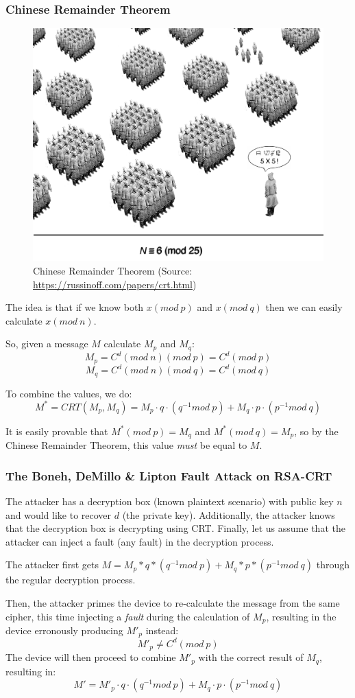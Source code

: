 \subsubsection{Chinese Remainder Theorem}
\begin{figure}[h!]
    \centering
    \includegraphics[width=0.5\linewidth]{images/ch9/soldiers.jpeg}
    \caption{Chinese Remainder Theorem (Source: \url{https://russinoff.com/papers/crt.html})}
    \label{fig:chinese_remainder}
\end{figure}
The idea is that if we know both $x (mod\ p)$ and $x (mod\ q)$ then we can easily calculate $x (mod\ n)$.

So, given a message $M$ calculate $M_p$ and $M_q$:
\[M_p = C^d (mod\ n)(mod\ p) = C^d (mod\ p)\]
\[M_q = C^d (mod\ n)(mod\ q) = C^d (mod\ q)\]

To combine the values, we do:
\[
    M^* = CRT(M_p, M_q) = M_p \cdot q \cdot (q^{-1} mod\ p) + M_q \cdot p \cdot (p^{-1} mod\ q)
\]

It is easily provable that \(M^*(mod\ p)=M_q\) and \(M^*(mod\ q)=M_p\), so by the Chinese Remainder Theorem, this value \emph{must} be equal to $M$.

\subsubsection{The Boneh, DeMillo \& Lipton Fault Attack on RSA-CRT \cite{bib:boneh}}

The attacker has a decryption box (known plaintext scenario) with public key $n$ and would like to recover $d$ (the private key). Additionally, the attacker knows that the decryption box is decrypting using CRT. Finally, let us assume that the attacker can inject a fault (any fault) in the decryption process.

The attacker first gets \(M = M_p*q*(q^{-1} mod\ p) + M_q*p*(p^{-1} mod\ q)\)
through the regular decryption process.

Then, the attacker primes the device to re-calculate the message from the same cipher, this time injecting a \emph{fault} during the calculation of $M_p$, resulting in the device erronously producing $M'_p$ instead:
\[M'_p \neq C^d (mod\ p)\]
The device will then proceed to combine $M'_p$ with the correct result of $M_q$, resulting in:
\[M' =  M'_p \cdot q \cdot (q^{-1} mod\ p) + M_q \cdot p \cdot (p^{-1} mod\ q)\]

